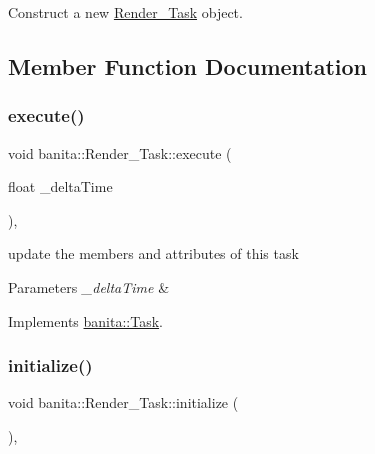 Construct a new \mbox{\hyperlink{classbanita_1_1_render___task}{Render\+\_\+\+Task}} object. 



\subsection{Member Function Documentation}
\mbox{\label{classbanita_1_1_render___task_a94a8e1921a653ec6da9d1797ad2abcab}} 
\subsubsection{\texorpdfstring{execute()}{execute()}}
{\footnotesize\ttfamily void banita\+::\+Render\+\_\+\+Task\+::execute (\begin{DoxyParamCaption}\item[{float}]{\+\_\+delta\+Time }\end{DoxyParamCaption})\hspace{0.3cm}{\ttfamily [override]}, {\ttfamily [virtual]}}



update the members and attributes of this task 


\begin{DoxyParams}{Parameters}
{\em \+\_\+delta\+Time} & \\
\hline
\end{DoxyParams}


Implements \mbox{\hyperlink{classbanita_1_1_task_aa79a45c9cbfac80ec9e4f060d5d444aa}{banita\+::\+Task}}.

\mbox{\label{classbanita_1_1_render___task_a34f649b5ad434cf7f6bb04604173afed}} 
\subsubsection{\texorpdfstring{initialize()}{initialize()}}
{\footnotesize\ttfamily void banita\+::\+Render\+\_\+\+Task\+::initialize (\begin{DoxyParamCaption}{ }\end{DoxyParamCaption})\hspace{0.3cm}{\ttfamily [override]}, {\ttfamily [virtual]}}



